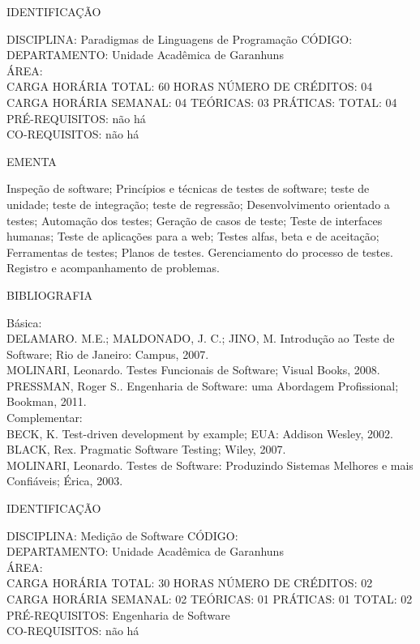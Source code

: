 \documentclass[
	12pt,				%
	openright,			%
  oneside,     %
	a4paper,			%
	english,			%
	french,				%
	spanish,			%
	brazil				%
	]{abntex2}
\begin{document}
\begin{apendicesenv}
\newpage IDENTIFICAÇÃO

DISCIPLINA: Paradigmas de Linguagens de Programação CÓDIGO:\\ 
DEPARTAMENTO: Unidade Acadêmica de Garanhuns\\
ÁREA: \\
CARGA HORÁRIA TOTAL: 60 HORAS NÚMERO DE CRÉDITOS: 04\\
CARGA HORÁRIA SEMANAL: 04 TEÓRICAS: 03 PRÁTICAS: TOTAL: 04 \\
PRÉ-REQUISITOS: não há\\
CO-REQUISITOS: não há

EMENTA 

Inspeção de software; Princípios e técnicas de testes de software; teste
de unidade; teste de integração; teste de regressão; Desenvolvimento
orientado a testes; Automação dos testes; Geração de casos de teste;
Teste de interfaces humanas; Teste de aplicações para a web; Testes
alfas, beta e de aceitação; Ferramentas de testes; Planos de testes.
Gerenciamento do processo de testes. Registro e acompanhamento de
problemas.

BIBLIOGRAFIA 

Básica:\\
DELAMARO. M.E.; MALDONADO, J. C.; JINO, M. Introdução ao Teste de
Software; Rio de Janeiro: Campus, 2007.\\
MOLINARI, Leonardo. Testes Funcionais de Software; Visual Books, 2008.\\
PRESSMAN, Roger S.. Engenharia de Software: uma Abordagem Profissional;
Bookman, 2011.\\
Complementar:\\
BECK, K. Test-driven development by example; EUA: Addison Wesley, 2002.\\
BLACK, Rex. Pragmatic Software Testing; Wiley, 2007.\\
MOLINARI, Leonardo. Testes de Software: Produzindo Sistemas Melhores e
mais Confiáveis; Érica, 2003.

\newpage IDENTIFICAÇÃO

DISCIPLINA: Medição de Software CÓDIGO:\\ 
DEPARTAMENTO: Unidade Acadêmica de Garanhuns\\
ÁREA: \\
CARGA HORÁRIA TOTAL: 30 HORAS NÚMERO DE CRÉDITOS: 02\\
CARGA HORÁRIA SEMANAL: 02 TEÓRICAS: 01 PRÁTICAS: 01 TOTAL: 02\\
PRÉ-REQUISITOS: Engenharia de Software\\
CO-REQUISITOS: não há


\end{apendicesenv}
\end{document}

